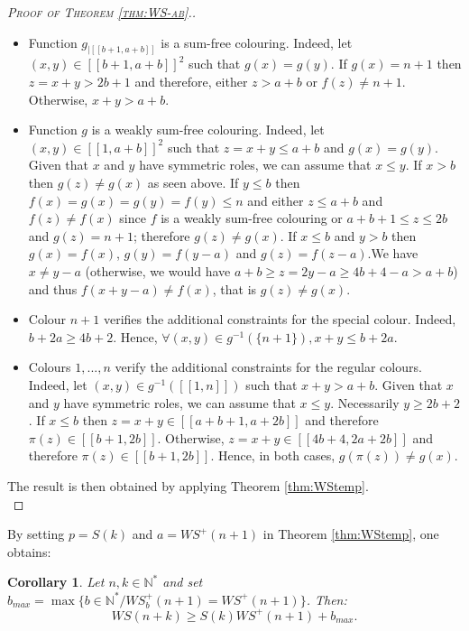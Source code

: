 \documentclass{article}
\newtheorem{computational theorem}[definition]{Computational Theorem}
\newtheorem{corollary}[definition]{Corollary}
\newcommand{\WS}{\mathit{WS}}
\begin{document}
\begin{proof}[\textsc{Proof of Theorem \ref{thm:WS-ab}.}]
\begin{itemize}
\item Function \(g_{|[\![b + 1, a + b]\!]}\) is a sum-free colouring. Indeed, let \((x, y) \in 
	[\![b + 1, a + b]\!]^2\) such that \(g(x) = g(y)\). If \(g(x) = n + 1\) then \(z = x + y > 2 b + 1\) 
	and therefore, either \(z > a + b\) or \(f(z) \neq n + 1\). Otherwise, \(x + y > a + b\).
\item Function \(g\) is a weakly sum-free colouring. Indeed, let \((x, y) \in [\![1, a + b]\!]^2\) such that 
	\(z = x + y \leqslant a + b\) and \(g(x) = g(y)\). Given that \(x\) and \(y\) have symmetric roles, 
	we can assume that \(x \leqslant y\). If \(x > b\) then \(g(z) \neq g(x)\) as seen above. If \(y \leqslant b\) then 
	\(f(x) = g(x) = g(y) = f(y) \leqslant n\) and either \(z \leqslant a + b\) and \(f(z) \neq f(x)\) since \(f\) is a weakly 
	sum-free colouring or \(a + b + 1 \leqslant z \leqslant 2 b\) and \(g(z) = n + 1\); therefore \(g(z) \neq g(x)\). If 
	\(x \leqslant b\) and \(y > b\) then \(g(x) = f(x)\), \(g(y) = f(y - a)\) and \(g(z) = f(z - a)\).We have \(x \neq y - a\) 
	(otherwise, we would have \(a + b \geqslant z = 2 y  - a \geqslant 4 b + 4 - a > a + b\)) and thus \(f(x + y - a) \neq f(x)\),
	that is \(g(z) \neq g(x)\).
\item Colour \(n + 1\) verifies the  additional constraints for the special colour. Indeed, \(b + 2 a \geqslant 4 b + 2\). 
	Hence, \(\forall (x, y) \in g^{-1}(\{n + 1\}), x + y \leqslant b + 2 a\).
\item Colours \(1, ..., n\) verify the  additional constraints for the regular colours. Indeed, let 
	\((x, y) \in g^{-1}([\![1, n]\!])\) such that \(x + y > a + b\). Given that \(x\) and \(y\) have symmetric roles, 
	we can assume that \(x \leqslant y\). Necessarily \(y \geqslant 2 b + 2\). If \(x \leqslant b\) then 
	\(z = x + y \in [\![a + b + 1, a + 2 b]\!]\) and therefore \(\pi(z) \in [\![b + 1, 2 b]\!]\). Otherwise, 
	\(z = x + y \in [\![4 b + 4, 2 a + 2 b]\!]\) and therefore \(\pi(z) \in [\![b + 1, 2 b]\!]\). Hence, in both cases, 
	\(g(\pi(z)) \neq g(x)\).
\end{itemize}

The result is then obtained by applying Theorem \ref{thm:WStemp}. \\
\end{proof}

By setting \(p = S(k)\) and \(a = \WS^+(n + 1)\) in Theorem \ref{thm:WStemp}, one obtains:

\begin{corollary}
\label{cor:ineqWS+}
Let \(n,k \in \mathbb{N}^*\) and set \( b_{max} = \max \{b\in \mathbb{N}^*/ \WS_b^+(n+1) = \WS^+(n+1)\}\).
Then:
\[
\WS(n+k) \geqslant S(k) \WS^+(n+1)+b_{max}.
\]
\end{corollary}
\end{document}
